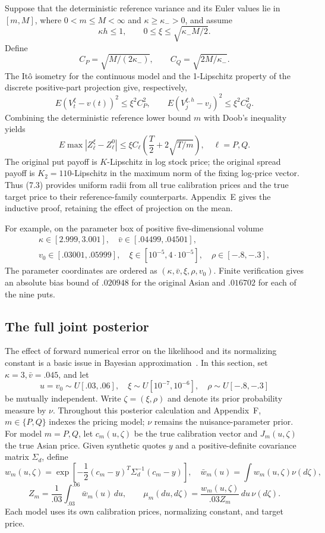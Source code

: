 \documentclass[11pt,a4paper]{article}
\begin{document}
Suppose that the deterministic reference variance and its Euler values lie in \([m,M]\),
where \(0<m\le M<\infty\) and \(\kappa\ge\kappa_->0\), and assume
\[
\kappa h\le1,\qquad
0\le\xi\le\sqrt{\kappa_-M/2}.
\tag{7.1}
\]
Define
\[
C_P=\sqrt{M/(2\kappa_-)},\qquad C_Q=\sqrt{2M/\kappa_-}.
\]
The It\^o isometry for the continuous model and the 1-Lipschitz property of the discrete
positive-part projection give, respectively,
\[
E(V_t^\xi-v(t))^2\le\xi^2C_P^2,\qquad
E(V_j^{\xi,h}-v_j)^2\le\xi^2C_Q^2.
\tag{7.2}
\]
Combining the deterministic reference lower bound \(m\) with Doob's inequality yields
\[
E\max|Z_\ell^\xi-Z_\ell^0|
\le\xi C_\ell\left(\frac T2+2\sqrt{T/m}\right),\quad \ell=P,Q.
\tag{7.3}
\]
The original put payoff is \(K\)-Lipschitz in log stock price; the original spread payoff is
\(K_2=110\)-Lipschitz in the maximum norm of the fixing log-price vector.
Thus (7.3) provides uniform radii from all true calibration prices and the true target price
to their reference-family counterparts. Appendix~E gives the inductive proof, retaining
the effect of projection on the mean.

For example, on the parameter box of positive five-dimensional volume
\[
\begin{gathered}
\kappa\in[2.999,3.001],\quad\bar v\in[.04499,.04501],\\
v_0\in[.03001,.05999],\quad \xi\in[10^{-5},4\cdot10^{-5}],
\quad\rho\in[-.8,-.3],
\end{gathered}
\tag{7.4}
\]
The parameter coordinates are ordered as \((\kappa,\bar v,\xi,\rho,v_0)\). Finite verification gives an absolute bias bound of \(.020948\) for the original Asian
and \(.016702\) for each of the nine puts.

\subsection{The full joint posterior}

The effect of forward numerical error on the likelihood and its normalizing constant
is a basic issue in Bayesian approximation~\cite{CotterDashtiStuart2010}.
In this section, set \(\kappa=3,\bar v=.045\), and let
\[
u=v_0\sim U[.03,.06],\quad
\xi\sim U[10^{-7},10^{-6}],\quad
\rho\sim U[-.8,-.3]
\tag{7.5}
\]
be mutually independent.
Write \(\zeta=(\xi,\rho)\) and denote its prior probability measure by \(\nu\). Throughout this posterior calculation and Appendix~F, \(m\in\{P,Q\}\) indexes the pricing model; \(\nu\) remains the nuisance-parameter prior.
For model \(m=P,Q\), let \(c_m(u,\zeta)\) be the true calibration vector and
\(J_m(u,\zeta)\) the true Asian price.
Given synthetic quotes \(y\) and a positive-definite covariance matrix \(\Sigma_d\), define
\[
w_m(u,\zeta)=
\exp\!\left[-\frac12(c_m-y)^T\Sigma_d^{-1}(c_m-y)\right],
\quad \bar w_m(u)=\int w_m(u,\zeta)\nu(d\zeta),
\]
\[
Z_m=\frac1{.03}\int_{.03}^{.06}\bar w_m(u)\,du,\qquad
\mu_m(du,d\zeta)=\frac{w_m(u,\zeta)}{.03Z_m}\,du\,\nu(d\zeta).
\tag{7.6}
\]
Each model uses its own calibration prices, normalizing constant, and target price.
\end{document}
